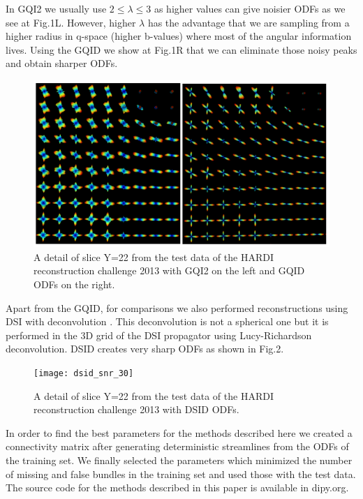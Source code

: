 \documentclass[9pt,conference,a4paper]{IEEEtran}
\begin{document}
In GQI2 we usually use $2\le\lambda\le3$  as higher values can give noisier ODFs as we see at Fig.1L. However, higher $\lambda$ has the advantage that we are sampling from a higher radius in q-space (higher b-values) where most of the angular information lives. Using the GQID we show at Fig.1R that we can eliminate those noisy peaks and obtain sharper ODFs.

\begin{figure}[h]
\begin{centering}
\includegraphics[scale=.9]{gqi2_vs_gqid_snr30}
\end{centering}
\caption{A detail of slice Y=22 from the test data of the HARDI reconstruction challenge 2013 with GQI2 on the left and GQID ODFs on the right.}
\end{figure}

Apart from the GQID, for comparisons we also performed reconstructions using DSI with deconvolution \cite{canales-rodriguez-etal:10}. This deconvolution is not a spherical one but it is performed in the 3D grid of the DSI propagator using Lucy-Richardson deconvolution. DSID creates very sharp ODFs as shown in Fig.2.

\begin{figure}[h]
\begin{centering}
\texttt{[image: dsid\_snr\_30]}
\end{centering}
\caption{A detail of slice Y=22 from the test data of the HARDI reconstruction challenge 2013 with DSID ODFs.}
\end{figure}

In order to find the best parameters for the methods described here we created a connectivity matrix after generating deterministic streamlines from the ODFs of the training set. We finally selected the parameters which minimized the number of missing and false bundles in the training set and used those with the test data. 
The source code for the methods described in this paper is available in dipy.org.


\end{document}

